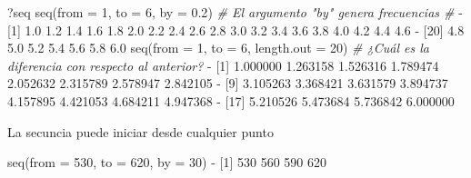 \documentclass[
]{book}
\newenvironment{Shaded}{\begin{snugshade}}{\end{snugshade}}
\newcommand{\AttributeTok}[1]{\textcolor[rgb]{0.77,0.63,0.00}{#1}}
\newcommand{\CommentTok}[1]{\textcolor[rgb]{0.56,0.35,0.01}{\textit{#1}}}
\newcommand{\DecValTok}[1]{\textcolor[rgb]{0.00,0.00,0.81}{#1}}
\newcommand{\FloatTok}[1]{\textcolor[rgb]{0.00,0.00,0.81}{#1}}
\newcommand{\FunctionTok}[1]{\textcolor[rgb]{0.00,0.00,0.00}{#1}}
\newcommand{\NormalTok}[1]{#1}
\newcommand{\SpecialCharTok}[1]{\textcolor[rgb]{0.00,0.00,0.00}{#1}}
\begin{document}
\begin{Shaded}
\begin{Highlighting}[]
\NormalTok{?seq}
\FunctionTok{seq}\NormalTok{(}\AttributeTok{from =} \DecValTok{1}\NormalTok{, }\AttributeTok{to =} \DecValTok{6}\NormalTok{, }\AttributeTok{by =} \FloatTok{0.2}\NormalTok{) }\CommentTok{\# El argumento "by" genera frecuencias \#}
\SpecialCharTok{{-}}\NormalTok{  [}\DecValTok{1}\NormalTok{] }\FloatTok{1.0} \FloatTok{1.2} \FloatTok{1.4} \FloatTok{1.6} \FloatTok{1.8} \FloatTok{2.0} \FloatTok{2.2} \FloatTok{2.4} \FloatTok{2.6} \FloatTok{2.8} \FloatTok{3.0} \FloatTok{3.2} \FloatTok{3.4} \FloatTok{3.6} \FloatTok{3.8} \FloatTok{4.0} \FloatTok{4.2} \FloatTok{4.4} \FloatTok{4.6}
\SpecialCharTok{{-}}\NormalTok{ [}\DecValTok{20}\NormalTok{] }\FloatTok{4.8} \FloatTok{5.0} \FloatTok{5.2} \FloatTok{5.4} \FloatTok{5.6} \FloatTok{5.8} \FloatTok{6.0}
\FunctionTok{seq}\NormalTok{(}\AttributeTok{from =} \DecValTok{1}\NormalTok{, }\AttributeTok{to =} \DecValTok{6}\NormalTok{, }\AttributeTok{length.out =} \DecValTok{20}\NormalTok{)  }\CommentTok{\# ¿Cuál es la diferencia con respecto al anterior? }
\SpecialCharTok{{-}}\NormalTok{  [}\DecValTok{1}\NormalTok{] }\FloatTok{1.000000} \FloatTok{1.263158} \FloatTok{1.526316} \FloatTok{1.789474} \FloatTok{2.052632} \FloatTok{2.315789} \FloatTok{2.578947} \FloatTok{2.842105}
\SpecialCharTok{{-}}\NormalTok{  [}\DecValTok{9}\NormalTok{] }\FloatTok{3.105263} \FloatTok{3.368421} \FloatTok{3.631579} \FloatTok{3.894737} \FloatTok{4.157895} \FloatTok{4.421053} \FloatTok{4.684211} \FloatTok{4.947368}
\SpecialCharTok{{-}}\NormalTok{ [}\DecValTok{17}\NormalTok{] }\FloatTok{5.210526} \FloatTok{5.473684} \FloatTok{5.736842} \FloatTok{6.000000}
\end{Highlighting}
\end{Shaded}

La secuncia puede iniciar desde cualquier punto

\begin{Shaded}
\begin{Highlighting}[]
\FunctionTok{seq}\NormalTok{(}\AttributeTok{from =} \DecValTok{530}\NormalTok{, }\AttributeTok{to =} \DecValTok{620}\NormalTok{, }\AttributeTok{by =} \DecValTok{30}\NormalTok{)}
\SpecialCharTok{{-}}\NormalTok{ [}\DecValTok{1}\NormalTok{] }\DecValTok{530} \DecValTok{560} \DecValTok{590} \DecValTok{620}
\end{Highlighting}
\end{Shaded}
\end{document}
